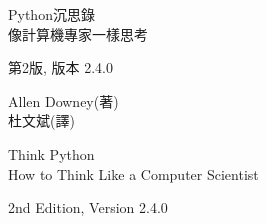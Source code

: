 \documentclass[10pt]{book}
\newcommand{\theversion}{2nd Edition, Version 2.4.0}
\newcommand{\thedate}{}
\begin{document}
\begin{latexonly}

\renewcommand{\blankpage}{\thispagestyle{empty} \quad \newpage}



\thispagestyle{empty}

\begin{flushright}
\vspace*{2.0in}

\begin{spacing}{3}
{\huge Python沉思錄}\\
{\Large 像計算機專家一樣思考}
\end{spacing}

\vspace{0.25in}

{\small 第2版, 版本 2.4.0}

\thedate
\vspace{1in}

{\Large
  Allen Downey(著)\\
}
{\small 杜文斌(譯)}
\vspace{0.5in}

\vfill

\end{flushright}


\blankpage
\blankpage

\pagebreak
\thispagestyle{empty}

\begin{flushright}
\vspace*{2.0in}

\begin{spacing}{3}
{\huge Think Python}\\
{\Large How to Think Like a Computer Scientist}
\end{spacing}

\vspace{0.25in}

\theversion

\thedate

\vspace{1in}



\end{flushright}
\end{latexonly}
\end{document}

